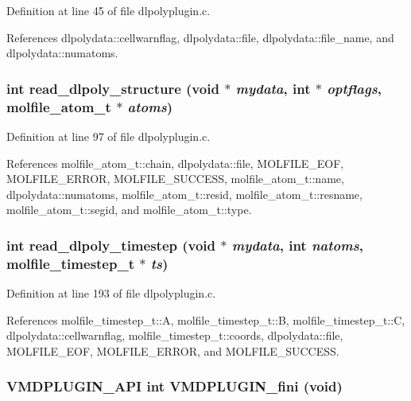 Definition at line 45 of file dlpolyplugin.c.

References dlpolydata::cellwarnflag, dlpolydata::file, dlpolydata::file\_\-name, and dlpolydata::numatoms.
\subsubsection{\setlength{\rightskip}{0pt plus 5cm}int read\_\-dlpoly\_\-structure (void $\ast$ {\em mydata}, int $\ast$ {\em optflags}, {\bf molfile\_\-atom\_\-t} $\ast$ {\em atoms})\hspace{0.3cm}{\tt  [static]}}\label{dlpolyplugin_8c_a3}




Definition at line 97 of file dlpolyplugin.c.

References molfile\_\-atom\_\-t::chain, dlpolydata::file, MOLFILE\_\-EOF, MOLFILE\_\-ERROR, MOLFILE\_\-SUCCESS, molfile\_\-atom\_\-t::name, dlpolydata::numatoms, molfile\_\-atom\_\-t::resid, molfile\_\-atom\_\-t::resname, molfile\_\-atom\_\-t::segid, and molfile\_\-atom\_\-t::type.
\subsubsection{\setlength{\rightskip}{0pt plus 5cm}int read\_\-dlpoly\_\-timestep (void $\ast$ {\em mydata}, int {\em natoms}, {\bf molfile\_\-timestep\_\-t} $\ast$ {\em ts})\hspace{0.3cm}{\tt  [static]}}\label{dlpolyplugin_8c_a4}




Definition at line 193 of file dlpolyplugin.c.

References molfile\_\-timestep\_\-t::A, molfile\_\-timestep\_\-t::B, molfile\_\-timestep\_\-t::C, dlpolydata::cellwarnflag, molfile\_\-timestep\_\-t::coords, dlpolydata::file, MOLFILE\_\-EOF, MOLFILE\_\-ERROR, and MOLFILE\_\-SUCCESS.
\subsubsection{\setlength{\rightskip}{0pt plus 5cm}VMDPLUGIN\_\-API int VMDPLUGIN\_\-fini (void)}\label{dlpolyplugin_8c_a8}




